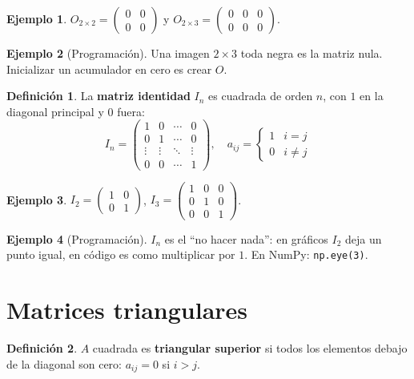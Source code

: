 \documentclass[a4paper,12pt]{article}
\theoremstyle{definition}
\newtheorem{definicion}{Definición}[section]
\newtheorem{ejemplo}{Ejemplo}[section]
\begin{document}
\begin{ejemplo}
$O_{2 \times 2} = \begin{pmatrix} 0 & 0 \\ 0 & 0 \end{pmatrix}$ y $O_{2 \times 3} = \begin{pmatrix} 0 & 0 & 0 \\ 0 & 0 & 0 \end{pmatrix}$.
\end{ejemplo}

\begin{ejemplo}[Programación]
Una imagen $2 \times 3$ toda negra es la matriz nula. Inicializar un acumulador en cero es crear $O$.
\end{ejemplo}

\begin{definicion}
La \textbf{matriz identidad} $I_n$ es cuadrada de orden $n$, con $1$ en la diagonal principal y $0$ fuera:
\[
I_n = \begin{pmatrix}
1 & 0 & \cdots & 0 \\
0 & 1 & \cdots & 0 \\
\vdots & \vdots & \ddots & \vdots \\
0 & 0 & \cdots & 1
\end{pmatrix}, \quad a_{ij} = \begin{cases} 1 & i=j \\ 0 & i \neq j \end{cases}
\]
\end{definicion}

\begin{ejemplo}
$I_2 = \begin{pmatrix} 1 & 0 \\ 0 & 1 \end{pmatrix}$, \quad $I_3 = \begin{pmatrix} 1 & 0 & 0 \\ 0 & 1 & 0 \\ 0 & 0 & 1 \end{pmatrix}$.
\end{ejemplo}

\begin{ejemplo}[Programación]
$I_n$ es el ``no hacer nada'': en gráficos $I_2$ deja un punto igual, en código es como multiplicar por $1$. En NumPy: \texttt{np.eye(3)}.
\end{ejemplo}

\newpage

\section{Matrices triangulares}
\begin{definicion}
$A$ cuadrada es \textbf{triangular superior} si todos los elementos debajo de la diagonal son cero: $a_{ij}=0$ si $i>j$.
\end{definicion}
\end{document}
